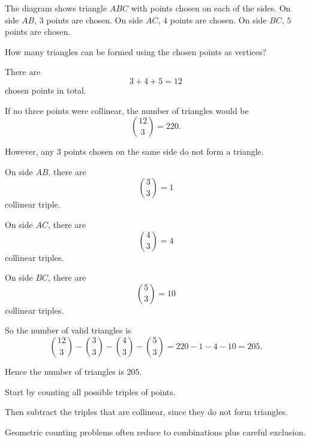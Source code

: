 \begin{problem}
The diagram shows triangle $ABC$ with points chosen on each of the sides. On side $AB$, $3$ points are chosen. On side $AC$, $4$ points are chosen. On side $BC$, $5$ points are chosen.

\begin{center}
\end{center}

How many triangles can be formed using the chosen points as vertices?
\end{problem}

\begin{solution}
There are
\[
3+4+5=12
\]
chosen points in total.

If no three points were collinear, the number of triangles would be
\[
\binom{12}{3}=220.
\]

However, any $3$ points chosen on the same side do not form a triangle.

On side $AB$, there are
\[
\binom{3}{3}=1
\]
collinear triple.

On side $AC$, there are
\[
\binom{4}{3}=4
\]
collinear triples.

On side $BC$, there are
\[
\binom{5}{3}=10
\]
collinear triples.

So the number of valid triangles is
\[
\binom{12}{3}-\binom{3}{3}-\binom{4}{3}-\binom{5}{3}
=220-1-4-10
=205.
\]

Hence the number of triangles is $\boxed{205}$.
\end{solution}

\begin{takeaways}
\item Start by counting all possible triples of points.
\item Then subtract the triples that are collinear, since they do not form triangles.
\item Geometric counting problems often reduce to combinations plus careful exclusion.
\end{takeaways}

